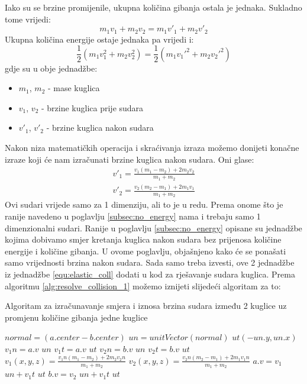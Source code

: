 Iako su se brzine promijenile, ukupna količina gibanja ostala je jednaka. Sukladno tome vrijedi:
\begin{equation}\label{equ:kol_gib}
	m_{1}  v_{1} + m_{2} v_{2} = m_{1}  v'_{1} + m_{2}  v'_{2}
\end{equation}
Ukupna količina energije ostaje jednaka pa vrijedi i:
\begin{equation}\label{equ:kol_energ}
\frac{1}{2}  (m_{1}  v_{1}^2 + m_{2}  v_{2}^2) = \frac{1}{2}  (m_{1}  v_{1}'^2 + m_{2}  v_{2}'^2)
\end{equation}
gdje su u obje jednadžbe:
\begin{itemize}
	\item $m_{1}$, $m_{2}$ - mase kuglica
	\item $v_{1}$, $v_{2}$ - brzine kuglica prije sudara
	\item $v'_{1}$, $v'_{2}$ - brzine kuglica nakon sudara
\end{itemize}
Nakon niza matematičkih operacija i skraćivanja izraza možemo donijeti konačne izraze koji će nam izračunati brzine kuglica nakon sudara. Oni glase\cite{13}:
\begin{equation}\label{equ:elastic_coll}
	\begin{aligned}
		v'_{1} = \frac{v_{1}  (m_{1} - m_{2}) + 2  m_{2} v_{2}}{m_{1} + m_{2}}\\
		v'_{2} = \frac{v_{2}  (m_{2} - m_{1}) + 2  m_{1} v_{1}}{m_{1} + m_{2}}
	\end{aligned}
\end{equation}
Ovi sudari vrijede samo za 1 dimenziju, ali to je u redu\cite{13}. Prema onome što je ranije navedeno u poglavlju \ref{subsec:no_energy} nama i trebaju samo 1 dimenzionalni sudari. Ranije u poglavlju \ref{subsec:no_energy} opisane su jednadžbe kojima dobivamo smjer kretanja kuglica nakon sudara bez prijenosa količine energije i količine gibanja. U ovome poglavlju, objašnjeno kako će se ponašati samo vrijednosti brzina nakon sudara. Sada samo treba izvesti, ove 2 jednadžbe iz jednadžbe \ref{equ:elastic_coll} dodati u kod za rješavanje sudara kuglica. Prema algoritmu \ref{alg:resolve_collision_1} možemo iznijeti slijedeći algoritam za to:\newline
\begin{algorithm}
	\caption{Algoritam za izračunavanje smjera i iznosa brzina sudara između 2 kuglice uz promjenu količine gibanja jedne kuglice}
	\label{alg:resolve_collision_2}
	\begin{algorithmic}
		\Return
		\EndIf
		\State $normal = (a.center - b.center)$
		\State $un = unitVector(normal)$
		\State $ut(-un.y,un.x)$
		\State $v_{1}n = a.v$ $un$
		\State $v_{1}t = a.v$  $ut$
		\State $v_{2}n = b.v$  $un$
		\State $v_{2}t = b.v$  $ut$
		\State $v_{1}(x,y,z) = \frac{v_{1}n  (m_{1} - m_{2}) + 2  m_{2} v_{2}n}{m_{1} + m_{2}}$
		\State $v_{2}(x,y,z) = \frac{v_{2}n  (m_{2} - m_{1}) + 2  m_{1} v_{1}n}{m_{1} + m_{2}}$
		\State $a.v = v_{1}$  $un + v_{1}t$  $ut$
		\State $b.v = v_{2}$  $un + v_{1}t$  $ut$
		\EndFunction
	\end{algorithmic}
\end{algorithm}\

